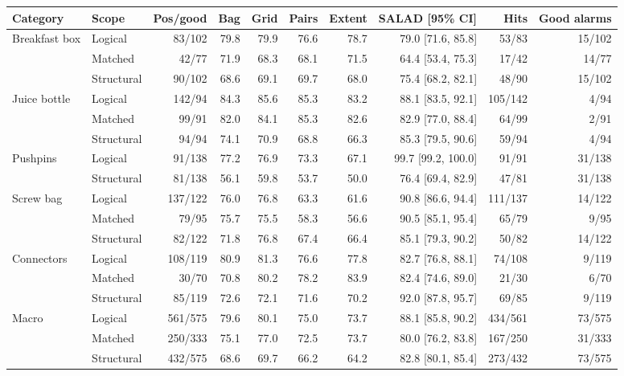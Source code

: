 \begin{tabular}{@{}llrrrrrrrr@{}}
\toprule
Category & Scope & Pos/good & Bag & Grid & Pairs & Extent & SALAD [95\% CI] & Hits & Good alarms \\
\midrule
Breakfast box & Logical & 83/102 & 79.8 & 79.9 & 76.6 & 78.7 & 79.0 [71.6, 85.8] & 53/83 & 15/102 \\
 & Matched & 42/77 & 71.9 & 68.3 & 68.1 & 71.5 & 64.4 [53.4, 75.3] & 17/42 & 14/77 \\
 & Structural & 90/102 & 68.6 & 69.1 & 69.7 & 68.0 & 75.4 [68.2, 82.1] & 48/90 & 15/102 \\
\midrule
Juice bottle & Logical & 142/94 & 84.3 & 85.6 & 85.3 & 83.2 & 88.1 [83.5, 92.1] & 105/142 & 4/94 \\
 & Matched & 99/91 & 82.0 & 84.1 & 85.3 & 82.6 & 82.9 [77.0, 88.4] & 64/99 & 2/91 \\
 & Structural & 94/94 & 74.1 & 70.9 & 68.8 & 66.3 & 85.3 [79.5, 90.6] & 59/94 & 4/94 \\
\midrule
Pushpins & Logical & 91/138 & 77.2 & 76.9 & 73.3 & 67.1 & 99.7 [99.2, 100.0] & 91/91 & 31/138 \\
 & Structural & 81/138 & 56.1 & 59.8 & 53.7 & 50.0 & 76.4 [69.4, 82.9] & 47/81 & 31/138 \\
\midrule
Screw bag & Logical & 137/122 & 76.0 & 76.8 & 63.3 & 61.6 & 90.8 [86.6, 94.4] & 111/137 & 14/122 \\
 & Matched & 79/95 & 75.7 & 75.5 & 58.3 & 56.6 & 90.5 [85.1, 95.4] & 65/79 & 9/95 \\
 & Structural & 82/122 & 71.8 & 76.8 & 67.4 & 66.4 & 85.1 [79.3, 90.2] & 50/82 & 14/122 \\
\midrule
Connectors & Logical & 108/119 & 80.9 & 81.3 & 76.6 & 77.8 & 82.7 [76.8, 88.1] & 74/108 & 9/119 \\
 & Matched & 30/70 & 70.8 & 80.2 & 78.2 & 83.9 & 82.4 [74.6, 89.0] & 21/30 & 6/70 \\
 & Structural & 85/119 & 72.6 & 72.1 & 71.6 & 70.2 & 92.0 [87.8, 95.7] & 69/85 & 9/119 \\
\midrule
Macro & Logical & 561/575 & 79.6 & 80.1 & 75.0 & 73.7 & 88.1 [85.8, 90.2] & 434/561 & 73/575 \\
 & Matched & 250/333 & 75.1 & 77.0 & 72.5 & 73.7 & 80.0 [76.2, 83.8] & 167/250 & 31/333 \\
 & Structural & 432/575 & 68.6 & 69.7 & 66.2 & 64.2 & 82.8 [80.1, 85.4] & 273/432 & 73/575 \\
\bottomrule
\end{tabular}
